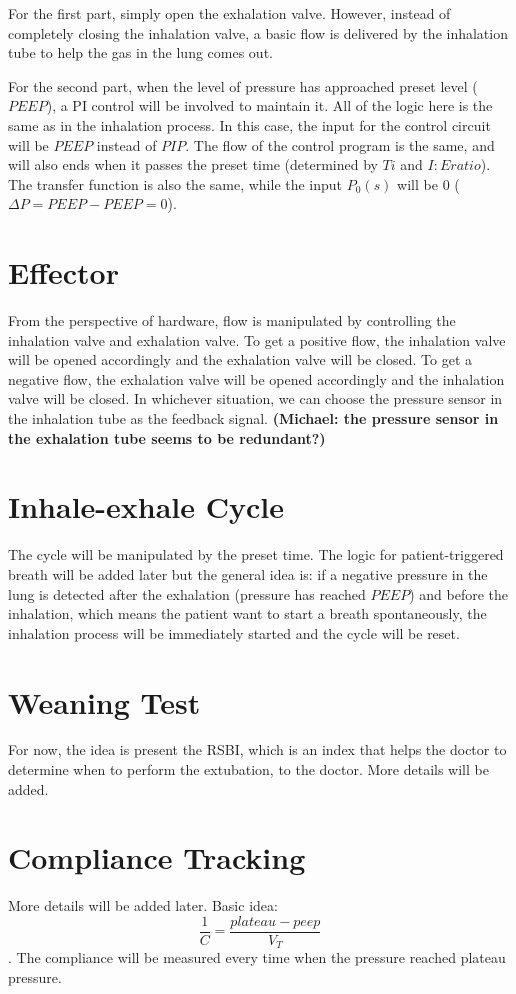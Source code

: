 \documentclass{article}
\begin{document}
For the first part, simply open the exhalation valve. However, instead of completely closing the inhalation valve, a basic flow is delivered by the inhalation tube to help the gas in the lung comes out.

For the second part, when the level of pressure has approached preset level ($PEEP$), a PI control will be involved to maintain it. All of the logic here is the same as in the inhalation process. In this case, the input for the control circuit will be $PEEP$ instead of $PIP$. The flow of the control program is the same, and will also ends when it passes the preset time (determined by $Ti$ and $I:E ratio$). The transfer function is also the same, while the input $P_0(s)$ will be $0$ ($\Delta P=PEEP-PEEP=0$).

\section{Effector}
From the perspective of hardware, flow is manipulated by controlling the inhalation valve and exhalation valve. To get a positive flow, the inhalation valve will be opened accordingly and the exhalation valve will be closed. To get a negative flow, the exhalation valve will be opened accordingly and the inhalation valve will be closed. In whichever situation, we can choose the pressure sensor in the inhalation tube as the feedback signal. \textbf{(Michael: the pressure sensor in the exhalation tube seems to be redundant?)}

\section{Inhale-exhale Cycle}
The cycle will be manipulated by the preset time. The logic for patient-triggered breath will be added later but the general idea is: if a negative pressure in the lung is detected after the exhalation (pressure has reached $PEEP$) and before the inhalation, which means the patient want to start a breath spontaneously, the inhalation process will be immediately started and the cycle will be reset.

\section{Weaning Test}
For now, the idea is present the RSBI, which is an index that helps the doctor to determine when to perform the extubation, to the doctor. More details will be added.

\section{Compliance Tracking}
More details will be added later. Basic idea:
$$\frac{1}{C}=\frac{plateau-peep}{V_T}$$. The compliance will be measured every time when the pressure reached plateau pressure.
\end{document}
